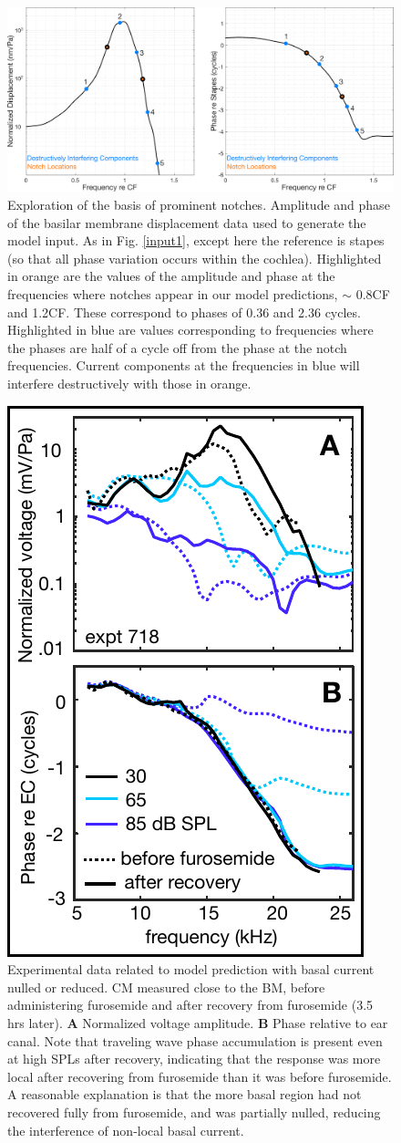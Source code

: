 \documentclass{biophys-new}
\begin{document}
\begin{figure}[h]
\centering
\includegraphics[width =  \textwidth]{final_figures/NotchExp2.pdf}
\caption{Exploration of the basis of prominent notches. Amplitude and phase of the basilar membrane displacement data used to generate the model input. As in Fig. \ref{input1}, except here the reference is stapes (so that all phase variation occurs within the cochlea). Highlighted in orange are the values of the amplitude and phase at the frequencies where notches appear in our model predictions, $\sim$ 0.8CF and 1.2CF. These correspond to phases of 0.36 and 2.36 cycles. Highlighted in blue are values corresponding to frequencies where the phases are half of a cycle off from the phase at the notch frequencies. Current components at the frequencies in blue will interfere destructively with those in orange.}
\label{notchcancel}
\end{figure}

{\begin{figure}[h]
\centering
\includegraphics[width=6 cm]{final_figures/Wang2.pdf}
\caption{Experimental data related to model prediction with basal current nulled or reduced. CM measured close to the BM, before administering furosemide and after recovery from furosemide (3.5 hrs later). \textbf{A} Normalized voltage amplitude. \textbf{B} Phase relative to ear canal.  Note that traveling wave phase accumulation is present even at high SPLs after recovery, indicating that the response was more local after recovering from furosemide than it was before furosemide. A reasonable explanation is that the more basal region had not recovered fully from furosemide, and was partially nulled, reducing the interference of non-local basal current.}
\label{Wang}
\end{figure}}
\end{document}
